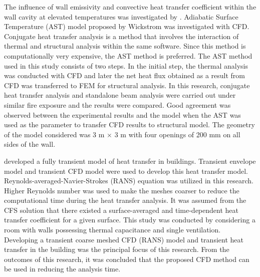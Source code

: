 The influence of wall emissivity and convective heat transfer coefficient within the wall cavity at elevated temperatures was investigated by \citet{Andreozzi2013}. Adiabatic Surface Temperature (AST) model proposed by Wickstrom was investigated with CFD. Conjugate heat transfer analysis is a method that involves the interaction of thermal and structural analysis within the same software. Since this method is computationally very expensive, the AST method is preferred. The AST method used in this study consists of two steps. In the initial step, the thermal analysis was conducted with CFD and later the net heat flux obtained as a result from CFD was transferred to FEM for structural analysis. In this research, conjugate heat transfer analysis and standalone beam analysis were carried out under similar fire exposure and the results were compared. Good agreement was observed between the experimental results and the model when the AST was used as the parameter to transfer CFD results to structural model. The geometry of the model considered was 3 m \(\times\) 3 m with four openings of 200 mm on all sides of the wall.

\citet{Arendt2014} developed a fully transient model of heat transfer in buildings. Transient envelope model and transient CFD model were used to develop this heat transfer model. Reynolds-averaged-Navier-Strokes (RANS) equation was utilized in this research. Higher Reynolds number was used to make the meshes coarser to reduce the computational time during the heat transfer analysis. It was assumed from the CFS solution that there existed a surface-averaged and time-dependent heat transfer coefficient for a given surface. This study was conducted by considering a room with walls possessing thermal capacitance and single ventilation. Developing a transient coarse meshed CFD (RANS) model and transient heat transfer in the building was the principal focus of this research. From the outcomes of this research, it was concluded that the proposed CFD method can be used in reducing the analysis time.

